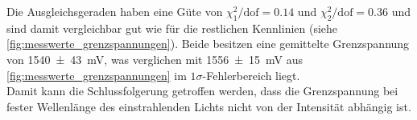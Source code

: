 Die Ausgleichsgeraden haben eine Güte von $\chi^2_1/\mathrm{dof} = \num{0.14}$ und 
$\chi^2_2/\mathrm{dof} = \num{0.36}$ und sind damit vergleichbar gut wie für die restlichen
Kennlinien (siehe \cref{fig:messwerte_grenzspannungen}). Beide besitzen eine gemittelte 
Grenzspannung von \SI{1540\pm43}{\milli\volt}, was verglichen mit \SI{1556\pm 15}{\milli\volt}
aus \cref{fig:messwerte_grenzspannungen} im $1\sigma$-Fehlerbereich liegt. \\
Damit kann die Schlussfolgerung getroffen werden, dass die Grenzspannung
bei fester Wellenlänge des einstrahlenden Lichts nicht von der Intensität abhängig ist.

